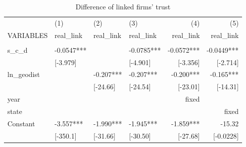 \documentclass[a4paper]{article}
\begin{document}
\begin{table}[htbp]
  \centering
  \caption{Difference of linked firms' trust}
    \begin{tabular}{p{9.7em}lllrr}
    \toprule
          & \multicolumn{1}{p{5.3em}}{(1)} & \multicolumn{1}{p{5.3em}}{(2)} & \multicolumn{1}{p{5.3em}}{(3)} & \multicolumn{1}{p{5.3em}}{(4)} & \multicolumn{1}{p{5.3em}}{(5)} \\
    VARIABLES & \multicolumn{1}{p{5.3em}}{real\_link} & \multicolumn{1}{p{5.3em}}{real\_link} & \multicolumn{1}{p{5.3em}}{real\_link} & \multicolumn{1}{p{5.3em}}{real\_link} & \multicolumn{1}{p{5.3em}}{real\_link} \\
    \midrule
          & \multicolumn{1}{p{5.3em}}{} & \multicolumn{1}{p{5.3em}}{} & \multicolumn{1}{p{5.3em}}{} & \multicolumn{1}{p{5.3em}}{} & \multicolumn{1}{p{5.3em}}{} \\
    s\_c\_d & \multicolumn{1}{p{5.3em}}{-0.0547***} & \multicolumn{1}{p{5.3em}}{} & \multicolumn{1}{p{5.3em}}{-0.0785***} & \multicolumn{1}{p{5.3em}}{-0.0572***} & \multicolumn{1}{p{5.3em}}{-0.0449***} \\
          & \multicolumn{1}{p{5.3em}}{[-3.979]} & \multicolumn{1}{p{5.3em}}{} & \multicolumn{1}{p{5.3em}}{[-4.901]} & \multicolumn{1}{p{5.3em}}{[-3.356]} & \multicolumn{1}{p{5.3em}}{[-2.714]} \\
    ln\_geodist & \multicolumn{1}{p{5.3em}}{} & \multicolumn{1}{p{5.3em}}{-0.207***} & \multicolumn{1}{p{5.3em}}{-0.207***} & \multicolumn{1}{p{5.3em}}{-0.200***} & \multicolumn{1}{p{5.3em}}{-0.165***} \\
          & \multicolumn{1}{p{5.3em}}{} & \multicolumn{1}{p{5.3em}}{[-24.66]} & \multicolumn{1}{p{5.3em}}{[-24.54]} & \multicolumn{1}{p{5.3em}}{[-23.01]} & \multicolumn{1}{p{5.3em}}{[-14.31]} \\
    year  &       &       &       & \multicolumn{1}{p{5.3em}}{fixed} &  \\
    state &       &       &       &       & \multicolumn{1}{p{5.3em}}{fixed} \\
    Constant & \multicolumn{1}{p{5.3em}}{-3.557***} & \multicolumn{1}{p{5.3em}}{-1.990***} & \multicolumn{1}{p{5.3em}}{-1.945***} & \multicolumn{1}{p{5.3em}}{-1.859***} & \multicolumn{1}{p{5.3em}}{-15.32} \\
          & \multicolumn{1}{p{5.3em}}{[-350.1]} & \multicolumn{1}{p{5.3em}}{[-31.66]} & \multicolumn{1}{p{5.3em}}{[-30.50]} & \multicolumn{1}{p{5.3em}}{[-27.68]} & \multicolumn{1}{p{5.3em}}{[-0.0228]} \\

\end{tabular}
\end{table}
\end{document}
